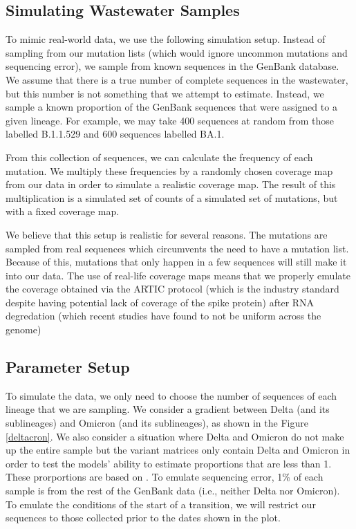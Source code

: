 \documentclass{article}
\begin{document}
\subsection{Simulating Wastewater Samples}

To mimic real-world data, we use the following simulation setup.
Instead of sampling from our mutation lists (which would ignore uncommon mutations and sequencing error), we sample from known sequences in the GenBank database.
We assume that there is a true number of complete sequences in the wastewater, but this number is not something that we attempt to estimate.
Instead, we sample a known proportion of the GenBank sequences that were assigned to a given lineage.
For example, we may take 400 sequences at random from those labelled B.1.1.529 and 600 sequences labelled BA.1.

From this collection of sequences, we can calculate the frequency of each mutation.
We multiply these frequencies by a randomly chosen coverage map from our data in order to simulate a realistic coverage map.
The result of this multiplication is a simulated set of counts of a simulated set of mutations, but with a fixed coverage map.

We believe that this setup is realistic for several reasons.
The mutations are sampled from real sequences which circumvents the need to have a mutation list.
Because of this, mutations that only happen in a few sequences will still make it into our data.
The use of real-life coverage maps means that we properly emulate the coverage obtained via the ARTIC protocol (which is the industry standard despite having potential lack of coverage of the spike protein) after RNA degredation (which recent studies have found to not be uniform across the genome) 

\subsection{Parameter Setup}

To simulate the data, we only need to choose the number of sequences of each lineage that we are sampling.
We consider a gradient between Delta (and its sublineages) and Omicron (and its sublineages), as shown in the Figure \ref{deltacron}.
We also consider a situation where Delta and Omicron do not make up the entire sample but the variant matrices only contain Delta and Omicron in order to test the models' ability to estimate proportions that are less than 1.
These prorportions are based on \cite{David's invasion paper}.
To emulate sequencing error, 1\% of each sample is from the rest of the GenBank data (i.e., neither Delta nor Omicron).
To emulate the conditions of the start of a transition, we will restrict our sequences to those collected prior to the dates shown in the plot.
\end{document}
